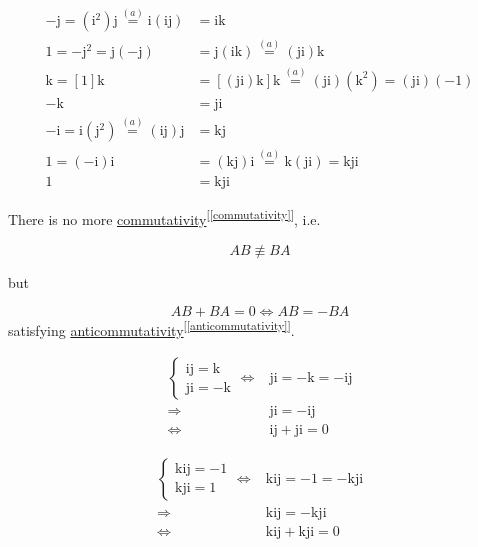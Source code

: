 \documentclass[
]{book}
\theoremstyle{definition}
\theoremstyle{definition}
\theoremstyle{definition}
\theoremstyle{definition}
\theoremstyle{remark}
\begin{document}
\[
\begin{aligned}
-\mathrm{j}=\left(\mathrm{i}^{2}\right)\mathrm{j}\overset{\left(a\right)}{=}\mathrm{i}\left(\mathrm{i}\mathrm{j}\right) & =\mathrm{i}\mathrm{k}\\
1=-\mathrm{j}^{2}=\mathrm{j}\left(-\mathrm{j}\right) & =\mathrm{j}\left(\mathrm{i}\mathrm{k}\right)\overset{\left(a\right)}{=}\left(\mathrm{j}\mathrm{i}\right)\mathrm{k}\\
\mathrm{k}=\left[1\right]\mathrm{k} & =\left[\left(\mathrm{j}\mathrm{i}\right)\mathrm{k}\right]\mathrm{k}\overset{\left(a\right)}{=}\left(\mathrm{j}\mathrm{i}\right)\left(\mathrm{k}^{2}\right)=\left(\mathrm{j}\mathrm{i}\right)\left(-1\right)\\
-\mathrm{k} & =\mathrm{j}\mathrm{i}\\
-\mathrm{i}=\mathrm{i}\left(\mathrm{j}^{2}\right)\overset{\left(a\right)}{=}\left(\mathrm{i}\mathrm{j}\right)\mathrm{j} & =\mathrm{k}\mathrm{j}\\
1=\left(-\mathrm{i}\right)\mathrm{i} & =\left(\mathrm{k}\mathrm{j}\right)\mathrm{i}\overset{\left(a\right)}{=}\mathrm{k}\left(\mathrm{j}\mathrm{i}\right)=\mathrm{k}\mathrm{j}\mathrm{i}\\
1 & =\mathrm{k}\mathrm{j}\mathrm{i}
\end{aligned}
\]

There is no more \hyperref[commutativity]{commutativity}\textsuperscript{{[}\ref{commutativity}{]}}, i.e.

\[
AB\not\equiv BA
\]

but

\[
AB+BA=0\Leftrightarrow AB=-BA
\]
satisfying \hyperref[anticommutativity]{anticommutativity}\textsuperscript{{[}\ref{anticommutativity}{]}}.

\[
\begin{aligned}
\begin{cases}
\mathrm{i}\mathrm{j}=\mathrm{k}\\
\mathrm{j}\mathrm{i}=-\mathrm{k}
\end{cases}\Leftrightarrow & \mathrm{j}\mathrm{i}=-\mathrm{k}=-\mathrm{i}\mathrm{j}\\
\Rightarrow & \mathrm{j}\mathrm{i}=-\mathrm{i}\mathrm{j}\\
\Leftrightarrow & \mathrm{i}\mathrm{j}+\mathrm{j}\mathrm{i}=0
\end{aligned}
\]

\[
\begin{aligned}
\begin{cases}
\mathrm{k}\mathrm{i}\mathrm{j}=-1\\
\mathrm{k}\mathrm{j}\mathrm{i}=1
\end{cases}\Leftrightarrow & \mathrm{k}\mathrm{i}\mathrm{j}=-1=-\mathrm{k}\mathrm{j}\mathrm{i}\\
\Rightarrow & \mathrm{k}\mathrm{i}\mathrm{j}=-\mathrm{k}\mathrm{j}\mathrm{i}\\
\Leftrightarrow & \mathrm{k}\mathrm{i}\mathrm{j}+\mathrm{k}\mathrm{j}\mathrm{i}=0
\end{aligned}
\]
\end{document}
